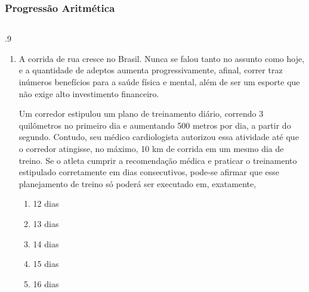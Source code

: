 \documentclass[aspectratio=169, t, 8pt]{beamer}
\newcounter{questaovest}
\newcommand{\vest}[1]{\stepcounter{questaovest}\item[\textbf{Questão \arabic{questaovest}} (#1):]}
\begin{document}
    \begin{frame}
        \frametitle{Progressão Aritmética}
        \begin{columns}
            \begin{column}{.9\textwidth}
                \begin{enumerate}
            \vest{ENEM-2ª apl-2010} A corrida de rua cresce no Brasil. Nunca se falou tanto no assunto como hoje, e a quantidade de adeptos aumenta progressivamente, afinal, correr traz inúmeros benefícios para a saúde física e mental, além de ser um esporte que não exige alto investimento financeiro.

            \vspace{0.2cm}
            
            Um corredor estipulou um plano de treinamento diário, correndo 3 quilômetros no primeiro dia e aumentando 500 metros por dia, a partir do segundo. Contudo, seu médico cardiologista autorizou essa atividade até que o corredor atingisse, no máximo, 10 km de corrida em um mesmo dia de treino. Se o atleta cumprir a recomendação médica e praticar o treinamento estipulado corretamente em dias consecutivos, pode-se afirmar que esse planejamento de treino só poderá ser executado em, exatamente,

            \vspace{0.2cm}

            \begin{enumerate}
                \item 12 dias
                \item 13 dias
                \item 14 dias
                \item 15 dias
                \item 16 dias
            \end{enumerate}
        \end{enumerate}
            \end{column}
        \end{columns}
    \end{frame}
\end{document}
